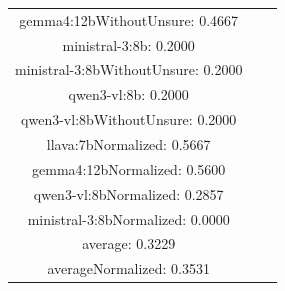 \documentclass[a4paper]{article}
\begin{document}
\begin{tabular}{ccc}
gemma4:12bWithoutUnsure: 0.4667 \\ ministral-3:8b: 0.2000 \\ ministral-3:8bWithoutUnsure: 0.2000 \\ qwen3-vl:8b: 0.2000 \\ qwen3-vl:8bWithoutUnsure: 0.2000 \\ llava:7bNormalized: 0.5667 \\ gemma4:12bNormalized: 0.5600 \\ qwen3-vl:8bNormalized: 0.2857 \\ ministral-3:8bNormalized: 0.0000 \\ average: 0.3229 \\ averageNormalized: 0.3531 \end{minipage}\\
\end{tabular}

\vspace{5mm}
\end{document}
